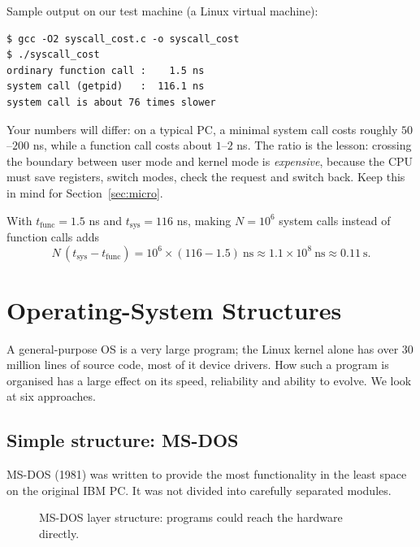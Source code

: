 \documentclass[11pt,a4paper]{article}
\begin{document}
Sample output on our test machine (a Linux virtual machine):

\begin{lstlisting}[style=term]
$ gcc -O2 syscall_cost.c -o syscall_cost
$ ./syscall_cost
ordinary function call :    1.5 ns
system call (getpid)   :  116.1 ns
system call is about 76 times slower
\end{lstlisting}

Your numbers will differ: on a typical PC, a minimal system call costs roughly $50$--$200$ ns, while a function call costs about $1$--$2$ ns. The ratio is the lesson: crossing the boundary between user mode and kernel mode is \emph{expensive}, because the CPU must save registers, switch modes, check the request and switch back. Keep this in mind for Section~\ref{sec:micro}.

\begin{example}
With $t_{\text{func}} = 1.5$ ns and $t_{\text{sys}} = 116$ ns, making $N = 10^{6}$ system calls instead of function calls adds
\[
N\,(t_{\text{sys}} - t_{\text{func}}) = 10^{6} \times (116 - 1.5)\ \text{ns} \approx 1.1\times10^{8}\ \text{ns} \approx 0.11\ \text{s}.
\]
\end{example}

\section{Operating-System Structures}
\label{sec:structures}

A general-purpose OS is a very large program; the Linux kernel alone has over $30$ million lines of source code, most of it device drivers. How such a program is organised has a large effect on its speed, reliability and ability to evolve. We look at six approaches.

\subsection{Simple structure: MS-DOS}
\label{sec:simple}

MS-DOS (1981) was written to provide the most functionality in the least space on the original IBM PC. It was not divided into carefully separated modules.

\begin{figure}[H]
\centering
{}
\caption{MS-DOS layer structure: programs could reach the hardware directly.}
\end{figure}
\end{document}
